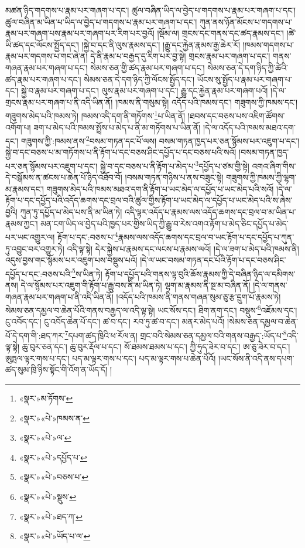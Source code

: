 མཚན་ཉིད་གདགས་པ་རྣམ་པར་གཞག་པ་དང་། ཚུལ་བཞིན་ཡིད་ལ་བྱེད་པ་གདགས་པ་རྣམ་པར་གཞག་པ་དང་། ཚུལ་བཞིན་མ་ཡིན་པ་ཡིད་ལ་བྱེད་པ་གདགས་པ་རྣམ་པར་གཞག་པ་དང་། ཀུན་ནས་ཉོན་མོངས་པ་གདགས་པ་རྣམ་པར་གཞག་པས་རྣམ་པར་གཞག་པར་རིག་པར་བྱའོ། །སྡོམ་ལ། གྲངས་དང་གནས་དང་ཚད་རྣམས་དང་། །ཚེ་ཡི་ཚད་དང་ལོངས་སྤྱོད་དང་། །སྐྱེ་བ་དང་ནི་ལུས་རྣམས་དང་། །རྒྱུ་དང་རྐྱེན་རྣམས་རྒྱ་ཆེར་རོ། །ཁམས་གདགས་པ་རྣམ་པར་གདགས་པ་གང་ཞེ་ན། དེ་ནི་རྣམ་པ་བརྒྱད་དུ་རིག་པར་བྱ་སྟེ། གྲངས་རྣམ་པར་གཞག་པ་དང་། གནས་གཞན་རྣམ་པར་གཞག་པ་དང་། སེམས་ཅན་གྱི་ཚད་རྣམ་པར་གཞག་པ་དང་། སེམས་ཅན་དེ་དག་ཉིད་ཀྱི་ཚེའི་ཚད་རྣམ་པར་གཞག་པ་དང་། སེམས་ཅན་དེ་དག་ཉིད་ཀྱི་ལོངས་སྤྱོད་དང་། ཡོངས་སུ་སྤྱོད་པ་རྣམ་པར་གཞག་པ་དང་། སྐྱེ་བ་རྣམ་པར་གཞག་པ་དང་། ལུས་རྣམ་པར་གཞག་པ་དང་། རྒྱུ་དང་རྐྱེན་རྣམ་པར་གཞག་པའོ། །དེ་ལ་གྲངས་རྣམ་པར་གཞག་པ་ནི་འདི་ཡིན་ནོ། །ཁམས་ནི་གསུམ་སྟེ། འདོད་པའི་ཁམས་དང་། གཟུགས་ཀྱི་ཁམས་དང་། གཟུགས་མེད་པའི་ཁམས་ཏེ། ཁམས་འདི་དག་ནི་གཏོགས་\footnote{«སྣར་»མ་ཏོགས་}པ་ཡིན་ནོ། །ཐབས་དང་བཅས་པས་འཇིག་ཚོགས་འགོག་པ། ཟག་པ་མེད་པའི་ཁམས་སྤྲོས་པ་མེད་པ་ནི་མ་གཏོགས་པ་ཡིན་ནོ། །དེ་ལ་འདོད་པའི་ཁམས་མཐའ་དག་དང་། གཟུགས་ཀྱི་:ཁམས་ནས་\footnote{«སྣར་»«པེ་»ཁམས་ན་}བསམ་གཏན་དང་པོ་ལས། བསམ་གཏན་ཁྱད་པར་ཅན་སྙོམས་པར་འཇུག་པ་དང་། སྐྱེ་བ་དང་བཅས་པ་མ་གཏོགས་པ་ནི་རྟོག་པ་དང་བཅས་ཤིང་དཔྱོད་པ་དང་བཅས་པའི་སའོ། །བསམ་གཏན་ཁྱད་པར་ཅན་སྙོམས་པར་འཇུག་པ་དང་། སྐྱེ་བ་དང་བཅས་པ་ནི་རྟོག་པ་མེད་པ་\footnote{«སྣར་»«པེ་»ལ་}དཔྱོད་པ་ཙམ་གྱི་སྟེ། འགའ་ཞིག་གིས་དེ་བསྒོམས་ན་ཚངས་པ་ཆེན་པོ་ཉིད་འཐོབ་བོ། །བསམ་གཏན་གཉིས་པ་ནས་བཟུང་སྟེ། གཟུགས་ཀྱི་ཁམས་ཀྱི་ལྷག་མ་རྣམས་དང་། གཟུགས་མེད་པའི་ཁམས་མཐའ་དག་ནི་རྟོག་པ་ཡང་མེད་ལ་དཔྱོད་པ་ཡང་མེད་པའི་སའོ། །དེ་ལ་རྟོག་པ་དང་དཔྱོད་པའི་འདོད་ཆགས་དང་བྲལ་བའི་ཚུལ་གྱིས་རྟོག་པ་ཡང་མེད་ལ་དཔྱོད་པ་ཡང་མེད་པའི་ས་ཞེས་བྱའི། ཀུན་ཏུ་དཔྱོད་པ་མེད་པས་ནི་མ་ཡིན་ཏེ། འདི་ལྟར་འདོད་པ་རྣམས་ལས་འདོད་ཆགས་དང་བྲལ་བ་མ་ཡིན་པ་རྣམས་ཀྱང་། མན་ངག་ཡིད་ལ་བྱེད་པའི་ཁྱད་པར་གྱིས་ཡིད་ཀྱི་རྒྱུ་བ་རེས་འགའ་རྟོག་པ་མེད་ཅིང་དཔྱོད་པ་མེད་པར་ཡང་འགྱུར་ལ། རྟོག་པ་དང་:བཅས་པ་\footnote{«སྣར་»«པེ་»དཔྱོད་པ་}རྣམས་ལས་འདོད་ཆགས་དང་བྲལ་བ་ཡང་རྟོག་པ་དང་དཔྱོད་པ་ཀུན་ཏུ་འབྱུང་བར་འགྱུར་ཏེ། འདི་ལྟ་སྟེ། དེར་སྐྱེས་པ་རྣམས་དང་ལངས་པ་རྣམས་ལའོ། །དེ་ལ་ཟག་པ་མེད་པའི་ཁམས་ནི། འདུས་བྱས་གང་སྙོམས་པར་འཇུག་པས་བསྡུས་པའོ། །དེ་ལ་ཡང་བསམ་གཏན་དང་པོའི་རྟོག་པ་དང་བཅས་ཤིང་དཔྱོད་པ་དང་:བཅས་པའི་\footnote{«སྣར་»«པེ་»བཅས་པ་}ས་ཡིན་ཏེ། རྟོག་པ་དཔྱོད་པའི་གནས་ལྟ་བུའི་ཆོས་རྣམས་ཀྱི་དེ་བཞིན་ཉིད་ལ་དམིགས་ནས། དེ་ལ་སྙོམས་པར་འཇུག་གི་རྟོག་པ་རྒྱུ་བས་ནི་མ་ཡིན་ཏེ། ལྷག་མ་རྣམས་ནི་སྔ་མ་བཞིན་ནོ། །དེ་ལ་གནས་གཞན་རྣམ་པར་གཞག་པ་ནི་འདི་ཡིན་ནོ། །འདོད་པའི་ཁམས་ནི་གནས་གཞན་སུམ་ཅུ་རྩ་དྲུག་པོ་རྣམས་ཏེ། སེམས་ཅན་དམྱལ་བ་ཆེན་པོའི་གནས་བརྒྱད་ལ་འདི་ལྟ་སྟེ། ཡང་སོས་དང་། ཐིག་ནག་དང་། བསྡུས་\footnote{«སྣར་»«པེ་»སྡུས་}འཇོམས་དང་། ངུ་འབོད་དང་། ངུ་འབོད་ཆེན་པོ་དང་། ཚ་བ་དང་། རབ་ཏུ་ཚ་བ་དང་། མནར་མེད་པའོ། །སེམས་ཅན་དམྱལ་བ་ཆེན་པོ་དེ་དག་གི་:ཐད་ཀར་\footnote{«སྣར་»«པེ་»ཐད་ཀ་}དཔག་ཚད་ཁྲིའི་ཕ་རོལ་ན། གྲང་བའི་སེམས་ཅན་དམྱལ་བའི་གནས་བརྒྱད་:ཡོད་པ་\footnote{«སྣར་»«པེ་»ཡོད་པ་ལ་}འདི་ལྟ་སྟེ། ཆུ་བུར་ཅན་དང་། ཆུ་བུར་རྡོལ་པ་དང་། སོ་ཐམས་ཐམས་པ་དང་། ཀྱི་ཧུད་ཟེར་བ་དང་། ཨ་ཅུ་ཟེར་བ་དང་། ཨུཏྤལ་ལྟར་གས་པ་དང་། པད་མ་ལྟར་གས་པ་དང་། པད་མ་ལྟར་གས་པ་ཆེན་པོའོ། །ཡང་སོས་ནི་འདི་ནས་དཔག་ཚད་སུམ་ཁྲི་ཉིས་སྟོང་གི་འོག་ན་ཡོད་དོ། །

